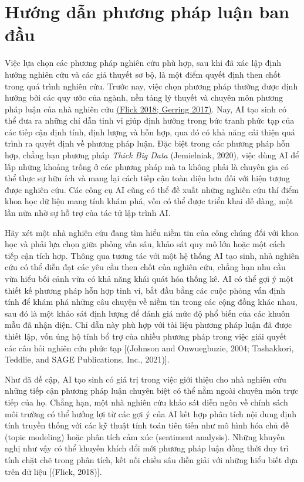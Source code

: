 \section{Hướng dẫn phương pháp luận ban đầu}

Việc lựa chọn các phương pháp nghiên cứu phù hợp, sau khi đã xác lập định hướng nghiên cứu và các giả thuyết sơ bộ, là một điểm quyết định then chốt trong quá trình nghiên cứu. Trước nay, việc chọn phương pháp thường được định hướng bởi các quy ước của ngành, nền tảng lý thuyết và chuyên môn phương pháp luận của nhà nghiên cứu \href{https://paperpile.com/c/uF2NXv/e5GM+47Mj}{(Flick 2018; Gerring 2017)}. Nay, AI tạo sinh có thể đưa ra những chỉ dẫn tinh vi giúp định hướng trong bức tranh phức tạp của các tiếp cận định tính, định lượng và hỗn hợp, qua đó có khả năng cải thiện quá trình ra quyết định về phương pháp luận. Đặc biệt trong các phương pháp hỗn hợp, chẳng hạn phương pháp \emph{Thick Big Data} (Jemielniak, 2020), việc dùng AI để lấp những khoảng trống ở các phương pháp mà ta không phải là chuyên gia có thể thực sự hữu ích và mang lại cách tiếp cận toàn diện hơn đối với hiện tượng được nghiên cứu. Các công cụ AI cũng có thể đề xuất những nghiên cứu thí điểm khoa học dữ liệu mang tính khám phá, vốn có thể được triển khai dễ dàng, một lần nữa nhờ sự hỗ trợ của tác tử lập trình AI.

Hãy xét một nhà nghiên cứu đang tìm hiểu niềm tin của công chúng đối với khoa học và phải lựa chọn giữa phỏng vấn sâu, khảo sát quy mô lớn hoặc một cách tiếp cận tích hợp. Thông qua tương tác với một hệ thống AI tạo sinh, nhà nghiên cứu có thể diễn đạt các yêu cầu then chốt của nghiên cứu, chẳng hạn nhu cầu vừa hiểu bối cảnh vừa có khả năng khái quát hóa thống kê. AI có thể gợi ý một thiết kế phương pháp hỗn hợp tinh vi, bắt đầu bằng các cuộc phỏng vấn định tính để khám phá những câu chuyện về niềm tin trong các cộng đồng khác nhau, sau đó là một khảo sát định lượng để đánh giá mức độ phổ biến của các khuôn mẫu đã nhận diện. Chỉ dẫn này phù hợp với tài liệu phương pháp luận đã được thiết lập, vốn ủng hộ tính bổ trợ của nhiều phương pháp trong việc giải quyết các câu hỏi nghiên cứu phức tạp {[}(Johnson and Onwuegbuzie, 2004; Tashakkori, Teddlie, and SAGE Publications, Inc., 2021){]}.

Như đã đề cập, AI tạo sinh có giá trị trong việc giới thiệu cho nhà nghiên cứu những tiếp cận phương pháp luận chuyên biệt có thể nằm ngoài chuyên môn trực tiếp của họ. Chẳng hạn, một nhà nghiên cứu khảo sát diễn ngôn về chính sách môi trường có thể hưởng lợi từ các gợi ý của AI kết hợp phân tích nội dung định tính truyền thống với các kỹ thuật tính toán tiên tiến như mô hình hóa chủ đề (topic modeling) hoặc phân tích cảm xúc (sentiment analysis). Những khuyến nghị như vậy có thể khuyến khích đổi mới phương pháp luận đồng thời duy trì tính chặt chẽ trong phân tích, kết nối chiều sâu diễn giải với những hiểu biết dựa trên dữ liệu {[}(Flick, 2018){]}.

